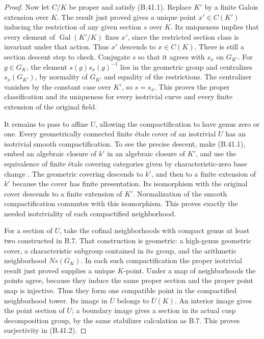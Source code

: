\begin{proof}
Now let $C/K$ be proper and satisfy (B.41.1).
Replace $K'$ by a finite Galois extension over
$K$. The result just proved gives a unique point
$x'\in C(K')$ inducing the restriction of any
given section $s$ over $K$. Its uniqueness implies
that every element of $\operatorname{Gal}(K'/K)$
fixes $x'$, since the restricted section class is
invariant under that action. Thus $x'$ descends
to $x\in C(K)$. There is still a section descent
step to check. Conjugate $s$ so that it agrees
with $s_x$ on $G_{K'}$. For $g\in G_K$, the
element $s(g)s_x(g)^{-1}$ lies in the geometric
group and centralizes $s_x(G_{K'})$, by normality
of $G_{K'}$ and equality of the restrictions.
The centralizer vanishes by the constant case
over $K'$, so $s=s_x$. This proves the proper
classification and its uniqueness for every
isotrivial curve and every finite extension of
the original field.

It remains to pass to affine $U$, allowing the
compactification to have genus zero or one.
Every geometrically connected finite \'etale
cover of an isotrivial $U$ has an isotrivial
smooth compactification. To see the precise
descent, make (B.41.1), embed an algebraic closure
of $k'$ in an algebraic closure of $K'$, and
use the equivalence of finite \'etale covering
categories given by characteristic-zero base
change \cite{B_LandesmanBaseChange}. The
geometric covering descends to $\overline{k'}$,
and then to a finite extension of $k'$ because
the cover has finite presentation. Its isomorphism
with the original cover descends to a finite
extension of $K'$. Normalization of the smooth
compactification commutes with this isomorphism.
This proves exactly the needed isotriviality of
each compactified neighborhood.

For a section of $U$, take the cofinal
neighborhoods with compact genus at least two
constructed in B.7. That construction is
geometric: a high-genus geometric cover,
a characteristic subgroup contained in its
group, and the arithmetic neighborhood
$N s(G_K)$. In each such compactification the
proper isotrivial result just proved supplies
a unique $K$-point. Under a map of neighborhoods
the points agree, because they induce the same
proper section and the proper point map is
injective. Thus they form one compatible point
in the compactified neighborhood tower. Its
image in $\overline U$ belongs to $\overline U(K)$.
An interior image gives the point section of
$U$; a boundary image gives a section in its
actual cusp decomposition group, by the same
stabilizer calculation as B.7. This proves
surjectivity in (B.41.2).


\end{proof}
